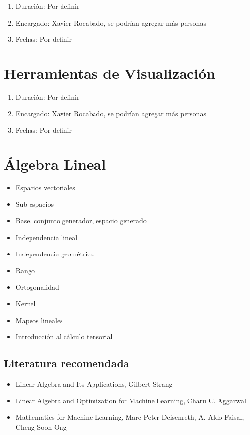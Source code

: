 \documentclass{article}
\begin{document}
        \begin{enumerate}
            \item Duración: Por definir
            \item Encargado: Xavier Rocabado, se podrían agregar más personas
            \item Fechas: Por definir
        \end{enumerate}

    \section{Herramientas de Visualización}

        \begin{enumerate}
            \item Duración: Por definir
            \item Encargado: Xavier Rocabado, se podrían agregar más personas
            \item Fechas: Por definir
        \end{enumerate}

    \section{Álgebra Lineal}

        \begin{itemize}
            \item Espacios vectoriales
            \item Sub-espacios
            \item Base, conjunto generador, espacio generado
            \item Independencia lineal
            \item Independencia geométrica
            \item Rango
            \item Ortogonalidad
            \item Kernel
            \item Mapeos lineales
            \item Introducción al cálculo tensorial
        \end{itemize}

        \subsection{Literatura recomendada}

            \begin{itemize}
                \item Linear Algebra and Its Applications, Gilbert Strang \cite{strang2006linear}
                \item Linear Algebra and Optimization for Machine Learning, Charu C. Aggarwal \cite{aggarwal2020linear}
                \item Mathematics for Machine Learning, Marc Peter Deisenroth, A. Aldo Faisal, Cheng Soon Ong \cite{deisenroth2020mathematics}
            \end{itemize}
\end{document}
